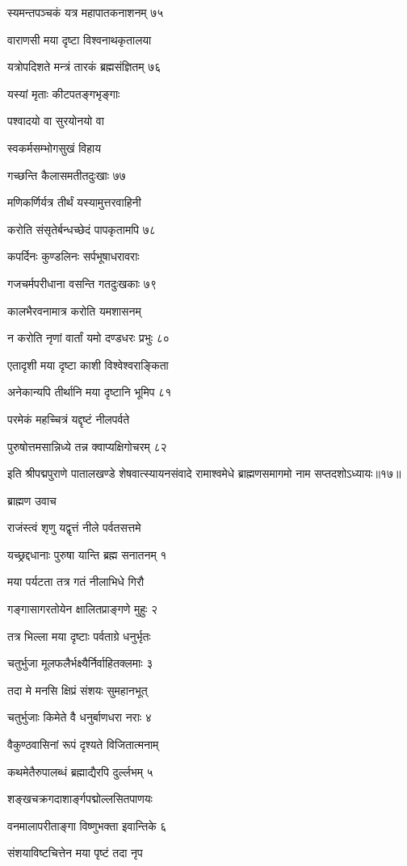 स्यमन्तपञ्चकं यत्र महापातकनाशनम् ७५

वाराणसी मया दृष्टा विश्वनाथकृतालया

यत्रोपदिशते मन्त्रं तारकं ब्रह्मसंज्ञितम् ७६

यस्यां मृताः कीटपतङ्गभृङ्गाः

पश्वादयो वा सुरयोनयो वा

स्वकर्मसम्भोगसुखं विहाय

गच्छन्ति कैलासमतीतदुःखाः ७७

मणिकर्णिर्यत्र तीर्थं यस्यामुत्तरवाहिनी

करोति संसृतेर्बन्धच्छेदं पापकृतामपि ७८

कपर्दिनः कुण्डलिनः सर्पभूषाधरावराः

गजचर्मपरीधाना वसन्ति गतदुःखकाः ७९

कालभैरवनामात्र करोति यमशासनम्

न करोति नृणां वार्तां यमो दण्डधरः प्रभुः ८०

एतादृशी मया दृष्टा काशी विश्वेश्वराङ्किता

अनेकान्यपि तीर्थानि मया दृष्टानि भूमिप ८१

परमेकं महच्चित्रं यद्दृष्टं नीलपर्वते

पुरुषोत्तमसान्निध्ये तन्न क्वाप्यक्षिगोचरम् ८२

इति श्रीपद्मपुराणे पातालखण्डे शेषवात्स्यायनसंवादे रामाश्वमेधे ब्राह्मणसमागमो नाम सप्तदशोऽध्यायः॥१७॥


ब्राह्मण उवाच

राजंस्त्वं शृणु यद्वृत्तं नीले पर्वतसत्तमे

यच्छ्रद्दधानाः पुरुषा यान्ति ब्रह्म सनातनम् १

मया पर्यटता तत्र गतं नीलाभिधे गिरौ

गङ्गासागरतोयेन क्षालितप्राङ्गणे मुहुः २

तत्र भिल्ला मया दृष्टाः पर्वताग्रे धनुर्भृतः

चतुर्भुजा मूलफलैर्भक्ष्यैर्निर्वाहितक्लमाः ३

तदा मे मनसि क्षिप्रं संशयः सुमहानभूत्

चतुर्भुजाः किमेते वै धनुर्बाणधरा नराः ४

वैकुण्ठवासिनां रूपं दृश्यते विजितात्मनाम्

कथमेतैरुपालब्धं ब्रह्माद्यैरपि दुर्ल्लभम् ५

शङ्खचक्रगदाशार्ङ्गपद्मोल्लसितपाणयः

वनमालापरीताङ्गा विष्णुभक्ता इवान्तिके ६

संशयाविष्टचित्तेन मया पृष्टं तदा नृप

